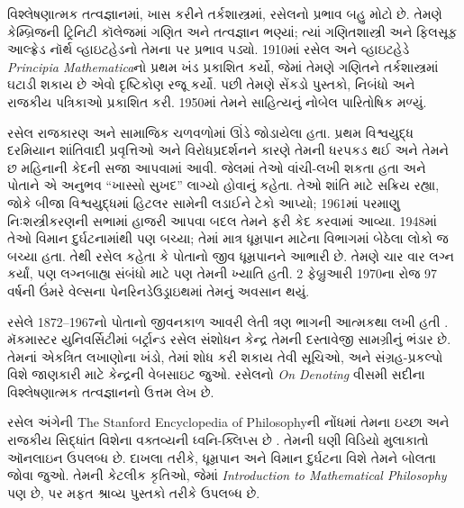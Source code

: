 વિશ્લેષણાત્મક તત્વજ્ઞાનમાં,
ખાસ કરીને તર્કશાસ્ત્રમાં,
રસેલનો પ્રભાવ બહુ મોટો
છે. તેમણે કેમ્બ્રિજની
ટ્રિનિટી કૉલેજમાં
ગણિત અને તત્વજ્ઞાન
ભણ્યાં; ત્યાં ગણિતશાસ્ત્રી
અને ફિલસૂફ આલ્ફ્રેડ
નૉર્થ વ્હાઇટહેડનો
તેમના પર પ્રભાવ
પડ્યો. 1910માં રસેલ
અને વ્હાઇટહેડે
\emph{Principia Mathematica}નો
પ્રથમ ખંડ પ્રકાશિત
કર્યો, જેમાં તેમણે
ગણિતને તર્કશાસ્ત્રમાં
ઘટાડી શકાય છે એવો
દૃષ્ટિકોણ રજૂ કર્યો.
પછી તેમણે સેંકડો
પુસ્તકો, નિબંધો અને
રાજકીય પત્રિકાઓ
પ્રકાશિત કરી. 1950માં
તેમને સાહિત્યનું
નોબેલ પારિતોષિક મળ્યું.

રસેલ રાજકારણ અને
સામાજિક ચળવળોમાં
ઊંડે જોડાયેલા હતા.
પ્રથમ વિશ્વયુદ્ધ
દરમિયાન શાંતિવાદી
પ્રવૃત્તિઓ અને
વિરોધપ્રદર્શનને
કારણે તેમની
ધરપકડ થઈ અને
તેમને છ મહિનાની
કેદની સજા
આપવામાં આવી. જેલમાં
તેઓ વાંચી-લખી
શકતા હતા અને
પોતાને એ અનુભવ
“ખાસ્સો સુખદ”
લાગ્યો હોવાનું
કહેતા. તેઓ શાંતિ માટે
સક્રિય રહ્યા, જોકે બીજા વિશ્વયુદ્ધમાં
હિટલર સામેની લડાઈને ટેકો આપ્યો;
1961માં પરમાણુ
નિઃશસ્ત્રીકરણની
સભામાં હાજરી
આપવા બદલ તેમને
ફરી કેદ કરવામાં
આવ્યા. 1948માં
તેઓ વિમાન દુર્ઘટનામાંથી
પણ બચ્યા; તેમાં
માત્ર ધૂમ્રપાન
માટેના વિભાગમાં
બેઠેલા લોકો જ
બચ્યા હતા. તેથી
રસેલ કહેતા કે
પોતાનો જીવ
ધૂમ્રપાનને આભારી
છે. તેમણે ચાર
વાર લગ્ન કર્યાં,
પણ લગ્નબાહ્ય
સંબંધો માટે પણ
તેમની ખ્યાતિ હતી.
2 ફેબ્રુઆરી 1970ના
રોજ 97 વર્ષની
ઉંમરે વેલ્સના
પેનરિનડેઉડ્રાઇથમાં
તેમનું અવસાન થયું.



\begin{reading}
રસેલે 1872--1967નો
પોતાનો જીવનકાળ
આવરી લેતી ત્રણ
ભાગની આત્મકથા
લખી હતી
\citep{Russell1967,Russell1968,Russell1969}.
મૅકમાસ્ટર યુનિવર્સિટીમાં
બર્ટ્રાન્ડ રસેલ સંશોધન
કેન્દ્ર તેમની દસ્તાવેજી
સામગ્રીનું ભંડાર છે.
તેમનાં એકત્રિત લખાણોના
ખંડો, તેમાં શોધ કરી
શકાય તેવી સૂચિઓ,
અને સંગ્રહ-પ્રકલ્પો
વિશે જાણકારી માટે
કેન્દ્રની વેબસાઇટ
\citet{Duncan2015} જુઓ.
રસેલનો
\emph{On
  Denoting}
\citep{Russell1905}
વીસમી સદીના
વિશ્લેષણાત્મક
તત્વજ્ઞાનનો ઉત્તમ
લેખ છે.

રસેલ અંગેની
The Stanford Encyclopedia of Philosophyની
નોંધમાં તેમના
ઇચ્છા અને રાજકીય
સિદ્ધાંત વિશેના
વક્તવ્યની ધ્વનિ-ક્લિપ્સ
છે \citep{Irvine2015}.
તેમની ઘણી વિડિયો
મુલાકાતો ઑનલાઇન
ઉપલબ્ધ છે. દાખલા
તરીકે, ધૂમ્રપાન
અને વિમાન દુર્ઘટના
વિશે તેમને બોલતા
જોવા \citet{RussellND}
જુઓ. તેમની કેટલીક
કૃતિઓ, જેમાં
\emph{Introduction to Mathematical Philosophy}
પણ છે, \citet{LibriVoxND}
પર મફત શ્રાવ્ય
પુસ્તકો તરીકે
ઉપલબ્ધ છે.
\end{reading}
\endgroup


\begingroup
\makeatletter{}\makeatother


